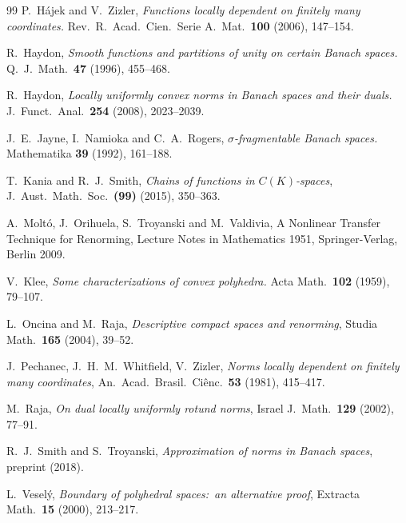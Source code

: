\documentclass[12pt,reqno]{amsart}
\theoremstyle{definition}
\begin{document}
\begin{thebibliography}{99}
 P.~H\'ajek and V.~Zizler, {\em Functions locally dependent on finitely many coordinates.} Rev.~R.~Acad.~Cien.~Serie A.~Mat.~\textbf{100} (2006), 147--154.

 R.~Haydon, {\em Smooth functions and partitions of unity on certain Banach spaces.} Q.~J.~Math.~\textbf{47} (1996), 455--468.

 R.~Haydon, {\em Locally uniformly convex norms in Banach spaces and their duals.} J.~Funct.~Anal.~\textbf{254} (2008), 2023--2039.

 J.~E.~Jayne, I.\ Namioka and C.\ A.\ Rogers, {\em $\sigma$-fragmentable Banach spaces.} Mathematika \textbf{39} (1992), 161--188.

 T.~Kania and R.~J.~Smith, {\em Chains of functions in $C(K)$-spaces}, J.~Aust.~Math.~Soc.~\textbf{(99)} (2015), 350--363.

 A.~Molt\'o, J.~Orihuela, S.~Troyanski and M.~Valdivia, A Nonlinear Transfer Technique for Renorming, Lecture Notes in Mathematics 1951, Springer-Verlag, Berlin 2009.

 V.~Klee, {\em Some characterizations of convex polyhedra.} Acta Math.~\textbf{102} (1959), 79--107.

 L.~Oncina and M.~Raja, {\em Descriptive compact spaces and renorming}, Studia Math.~\textbf{165} (2004), 39--52.

 J.~Pechanec, J.~H.~M.~Whitfield, V.~Zizler, {\em Norms locally dependent on finitely many coordinates}, An.~Acad.~Brasil.~Ci\^enc.~\textbf{53} (1981), 415--417. 

 M.~Raja, {\em On dual locally uniformly rotund norms}, Israel J.~Math.~\textbf{129} (2002), 77--91.

 R.~J.~Smith and S.~Troyanski, {\em Approximation of norms in Banach spaces}, preprint (2018).

 L.~Vesel\'y, {\em Boundary of polyhedral spaces:\ an alternative proof}, Extracta Math.~\textbf{15} (2000), 213--217.
\end{thebibliography}
\end{document}
